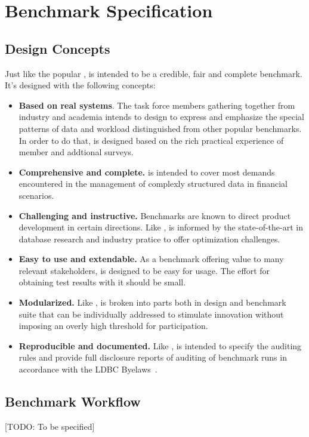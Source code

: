 \chapter{Benchmark Specification}
\label{sec:benchmark-specification}

\section{Design Concepts}

Just like the popular \ldbcsnb, \ldbcfinbench is intended to be a credible, fair and complete benchmark.
It's designed with the following concepts:

\begin{itemize}
 \item \textbf{Based on real systems}. The task force members gathering together from industry and academia
     intends to design \ldbcfinbench to express and emphasize the special patterns of data and workload
     distinguished from other popular benchmarks. In order to do that, \ldbcfinbench is designed based on
     the rich practical experience of member and addtional surveys.
 \item \textbf{Comprehensive and complete.} \ldbcfinbench is intended to cover most demands encountered
    in the management of complexly structured data in financial scenarios.
 \item \textbf{Challenging and instructive.} Benchmarks are known to direct product development in
    certain directions. Like \ldbcsnb, \ldbcfinbench is informed by the state-of-the-art in database research
    and industry pratice to offer optimization challenges.
 \item \textbf{Easy to use and extendable.} As a benchmark offering value to many relevant stakeholders,
    \ldbcfinbench is designed to be easy for usage. The effort for obtaining test results with it should
    be small.
 \item \textbf{Modularized.} Like \ldbcsnb, \ldbcfinbench is broken into parts both in design and benchmark
     suite that can be individually addressed to stimulate innovation without imposing an overly high threshold
     for participation.
 \item \textbf{Reproducible and documented.} Like \ldbcsnb, \ldbcfinbench is intended to specify the auditing
     rules and provide full disclosure reports of auditing of benchmark runs in accordance with the LDBC
     Byelaws~\cite{ldbc_byelaws}.
\end{itemize}


\section{Benchmark Workflow}
[TODO: To be specified]

